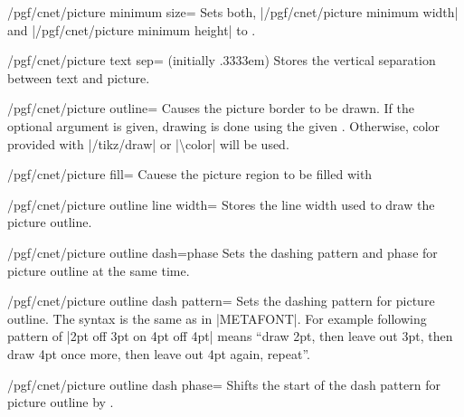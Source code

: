 \documentclass[a4paper]{ltxdoc}
\begin{document}
\begin{key}{/pgf/cnet/picture minimum size=}
  Sets both, |/pgf/cnet/picture minimum width|
  and |/pgf/cnet/picture minimum height| to .
\end{key}

\begin{key}{/pgf/cnet/picture text sep= (initially .3333em)}
  Stores the vertical separation between text and picture.
\end{key}

\begin{key}{/pgf/cnet/picture outline=}
  Causes the picture border to be drawn. If the optional  argument
  is given, drawing is done using the given . Otherwise, color
  provided with |/tikz/draw| or |\textbackslash{color}| will be used.
\end{key}

\begin{key}{/pgf/cnet/picture fill=}
  Cauese the picture region to be filled with 
\end{key}

\begin{key}{/pgf/cnet/picture outline line width=}
  Stores the line width used to draw the picture outline.
\end{key}

\begin{key}{/pgf/cnet/picture outline dash=phase}
  Sets the dashing pattern and phase for picture outline at the same time.
\end{key}

\begin{key}{/pgf/cnet/picture outline dash pattern=}
  Sets the dashing pattern for picture outline. The syntax is the same as in
  |METAFONT|. For example following pattern of |2pt off 3pt on 4pt off 4pt|
  means ``draw 2pt, then leave out 3pt, then draw 4pt once more, then leave out
  4pt again, repeat''.
\end{key}

\begin{key}{/pgf/cnet/picture outline dash phase=}
  Shifts the start of the dash pattern for picture outline by .
\end{key}
\end{document}
